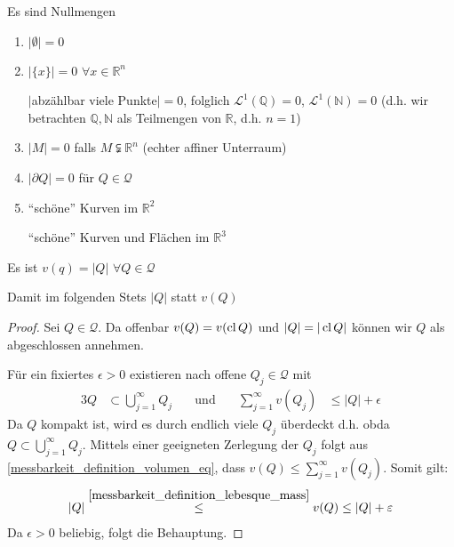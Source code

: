 \begin{example} Es sind Nullmengen
	\begin{enumerate}[label={(\alph*)}]
		\item $\vert \emptyset\vert = 0$
		\item $\vert \{ x\} \vert = 0$ $\forall x\in\mathbb{R}^n$
		
		$\vert$abzählbar viele Punkte$\vert = 0$, folglich $\mathcal{L}^1(\mathbb{Q}) = 0$, $\mathcal{L}^1(\mathbb{N}) = 0$ (d.h. wir betrachten $\mathbb{Q}, \mathbb{N}$ als Teilmengen von $\mathbb{R}$, d.h. $n=1$)
		\item $\vert M \vert = 0$ falls $M\subsetneqq \mathbb{R}^n$ (echter affiner Unterraum)
		\item $\vert \partial Q\vert = 0$ für $Q\in\mathcal{Q}$
		\item "`schöne"' Kurven im $\mathbb{R}^2$
		
		"`schöne"' Kurven und Flächen im $\mathbb{R}^3$
	\end{enumerate}
\end{example}

\begin{conclusion}
	Es ist $v(q) = \vert Q\vert$ $\forall Q\in\mathcal{Q}$
	
	Damit im folgenden Stets $\vert Q\vert$ statt $v(Q)$
\end{conclusion}
\begin{proof}
	Sei $Q\in\mathcal{Q}$. Da offenbar $v(Q) = v(\cl Q)$ und $\vert Q\vert = \vert \cl Q\vert$ können wir $Q$ als abgeschlossen annehmen.
	
	Für ein fixiertes $\epsilon > 0$ existieren nach  offene $Q_j\in\mathcal{Q}$ mit \begin{alignat*}{3}
		Q&\subset\bigcup_{j=1}^\infty Q_j &\quad\text{und}\quad& \sum_{j=1}^\infty v(Q_j) &\le \vert Q \vert + \epsilon
	\end{alignat*}
	Da $Q$ kompakt ist, wird es durch endlich viele $Q_j$ überdeckt d.h. \gls{obda} $Q\subset\bigcup_{j=1}^\infty Q_j$. Mittels einer geeigneten Zerlegung der $Q_j$ folgt aus \eqref{messbarkeit_definition_volumen_eq}, dass $v(Q)\le \sum_{j=1}^\infty v(Q_j)$. Somit gilt: \begin{align*}
		\vert Q \vert \overset{\eqref{messbarkeit_definition_lebesque_mass}}{\le} v(Q) \le \vert Q \vert + \epsilon
	\end{align*}
	Da $\epsilon > 0$ beliebig, folgt die Behauptung.
\end{proof}

